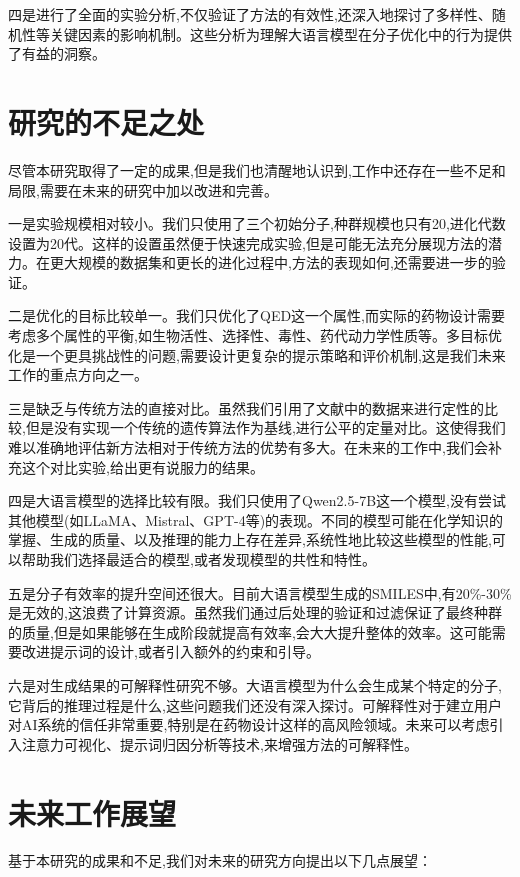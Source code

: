 四是进行了全面的实验分析,不仅验证了方法的有效性,还深入地探讨了多样性、随机性等关键因素的影响机制。这些分析为理解大语言模型在分子优化中的行为提供了有益的洞察。

\section{研究的不足之处}

尽管本研究取得了一定的成果,但是我们也清醒地认识到,工作中还存在一些不足和局限,需要在未来的研究中加以改进和完善。

一是实验规模相对较小。我们只使用了三个初始分子,种群规模也只有20,进化代数设置为20代。这样的设置虽然便于快速完成实验,但是可能无法充分展现方法的潜力。在更大规模的数据集和更长的进化过程中,方法的表现如何,还需要进一步的验证。

二是优化的目标比较单一。我们只优化了QED这一个属性,而实际的药物设计需要考虑多个属性的平衡,如生物活性、选择性、毒性、药代动力学性质等。多目标优化是一个更具挑战性的问题,需要设计更复杂的提示策略和评价机制,这是我们未来工作的重点方向之一。

三是缺乏与传统方法的直接对比。虽然我们引用了文献中的数据来进行定性的比较,但是没有实现一个传统的遗传算法作为基线,进行公平的定量对比。这使得我们难以准确地评估新方法相对于传统方法的优势有多大。在未来的工作中,我们会补充这个对比实验,给出更有说服力的结果。

四是大语言模型的选择比较有限。我们只使用了Qwen2.5-7B这一个模型,没有尝试其他模型(如LLaMA、Mistral、GPT-4等)的表现。不同的模型可能在化学知识的掌握、生成的质量、以及推理的能力上存在差异,系统性地比较这些模型的性能,可以帮助我们选择最适合的模型,或者发现模型的共性和特性。

五是分子有效率的提升空间还很大。目前大语言模型生成的SMILES中,有20\%-30\%是无效的,这浪费了计算资源。虽然我们通过后处理的验证和过滤保证了最终种群的质量,但是如果能够在生成阶段就提高有效率,会大大提升整体的效率。这可能需要改进提示词的设计,或者引入额外的约束和引导。

六是对生成结果的可解释性研究不够。大语言模型为什么会生成某个特定的分子,它背后的推理过程是什么,这些问题我们还没有深入探讨。可解释性对于建立用户对AI系统的信任非常重要,特别是在药物设计这样的高风险领域。未来可以考虑引入注意力可视化、提示词归因分析等技术,来增强方法的可解释性。

\section{未来工作展望}

基于本研究的成果和不足,我们对未来的研究方向提出以下几点展望：

